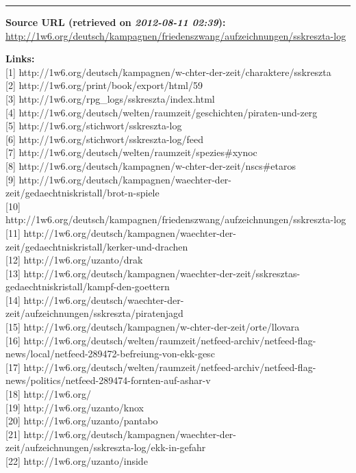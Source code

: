 \documentclass[11pt]{scrartcl}
\begin{document}
\begin{center}\rule{3in}{0.4pt}\end{center}

\textbf{Source URL (retrieved on \emph{2012-08-11 02:39}):}
\href{http://1w6.org/deutsch/kampagnen/friedenszwang/aufzeichnungen/sskreszta-log}{http://1w6.org/deutsch/kampagnen/friedenszwang/aufzeichnungen/sskreszta-log}

\textbf{Links:}\\{[}1{]}
http://1w6.org/deutsch/kampagnen/w-chter-der-zeit/charaktere/sskreszta\\
{[}2{]} http://1w6.org/print/book/export/html/59\\ {[}3{]}
http://1w6.org/rpg\_logs/sskreszta/index.html\\ {[}4{]}
http://1w6.org/deutsch/welten/raumzeit/geschichten/piraten-und-zerg\\
{[}5{]} http://1w6.org/stichwort/sskreszta-log\\ {[}6{]}
http://1w6.org/stichwort/sskreszta-log/feed\\ {[}7{]}
http://1w6.org/deutsch/welten/raumzeit/spezies\#xynoc\\ {[}8{]}
http://1w6.org/deutsch/kampagnen/w-chter-der-zeit/nscs\#etaros\\ {[}9{]}
http://1w6.org/deutsch/kampagnen/waechter-der-zeit/gedaechtniskristall/brot-n-spiele\\
{[}10{]}
http://1w6.org/deutsch/kampagnen/friedenszwang/aufzeichnungen/sskreszta-log\\
{[}11{]}
http://1w6.org/deutsch/kampagnen/waechter-der-zeit/gedaechtniskristall/kerker-und-drachen\\
{[}12{]} http://1w6.org/uzanto/drak\\ {[}13{]}
http://1w6.org/deutsch/kampagnen/waechter-der-zeit/sskresztas-gedaechtniskristall/kampf-den-goettern\\
{[}14{]}
http://1w6.org/deutsch/waechter-der-zeit/aufzeichnungen/sskreszta/piratenjagd\\
{[}15{]}
http://1w6.org/deutsch/kampagnen/w-chter-der-zeit/orte/llovara\\
{[}16{]}
http://1w6.org/deutsch/welten/raumzeit/netfeed-archiv/netfeed-flag-news/local/netfeed-289472-befreiung-von-ekk-gesc\\
{[}17{]}
http://1w6.org/deutsch/welten/raumzeit/netfeed-archiv/netfeed-flag-news/politics/netfeed-289474-fornten-auf-ashar-v\\
{[}18{]} http://1w6.org/\\ {[}19{]} http://1w6.org/uzanto/knox\\
{[}20{]} http://1w6.org/uzanto/pantabo\\ {[}21{]}
http://1w6.org/deutsch/kampagnen/waechter-der-zeit/aufzeichnungen/sskreszta-log/ekk-in-gefahr\\
{[}22{]} http://1w6.org/uzanto/inside\\
\end{document}
